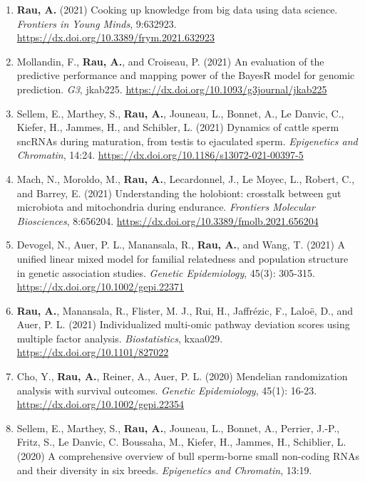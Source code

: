 \documentclass[11pt, a4paper]{awesome-cv}
\providecommand{\tightlist}{%
	\setlength{\itemsep}{0pt}\setlength{\parskip}{0pt}}
\begin{document}
\begin{enumerate}
\def\labelenumi{\arabic{enumi}.}
\tightlist
\item
  \textbf{Rau, A.} (2021) Cooking up knowledge from big data using data
  science. \emph{Frontiers in Young Minds}, 9:632923.
  \url{https://dx.doi.org/10.3389/frym.2021.632923}
\item
  Mollandin, F., \textbf{Rau, A.}, and Croiseau, P. (2021) An evaluation
  of the predictive performance and mapping power of the BayesR model
  for genomic prediction. \emph{G3}, jkab225.
  \url{https://dx.doi.org/10.1093/g3journal/jkab225}
\item
  Sellem, E., Marthey, S., \textbf{Rau, A.}, Jouneau, L., Bonnet, A., Le
  Danvic, C., Kiefer, H., Jammes, H., and Schibler, L. (2021) Dynamics
  of cattle sperm sncRNAs during maturation, from testis to ejaculated
  sperm. \emph{Epigenetics and Chromatin}, 14:24.
  \url{https://dx.doi.org/10.1186/s13072-021-00397-5}
\item
  Mach, N., Moroldo, M., \textbf{Rau, A.}, Lecardonnel, J., Le Moyec,
  L., Robert, C., and Barrey, E. (2021) Understanding the holobiont:
  crosstalk between gut microbiota and mitochondria during endurance.
  \emph{Frontiers Molecular Biosciences}, 8:656204.
  \url{https://dx.doi.org/10.3389/fmolb.2021.656204}
\item
  Devogel, N., Auer, P. L., Manansala, R., \textbf{Rau, A.}, and Wang,
  T. (2021) A unified linear mixed model for familial relatedness and
  population structure in genetic association studies. \emph{Genetic
  Epidemiology}, 45(3): 305-315.
  \url{https://dx.doi.org/10.1002/gepi.22371}
\item
  \textbf{Rau, A.}, Manansala, R., Flister, M. J., Rui, H., Jaffrézic,
  F., Laloë, D., and Auer, P. L. (2021) Individualized multi-omic
  pathway deviation scores using multiple factor analysis.
  \emph{Biostatistics}, kxaa029. \url{https://dx.doi.org/10.1101/827022}
\item
  Cho, Y., \textbf{Rau, A.}, Reiner, A., Auer, P. L. (2020) Mendelian
  randomization analysis with survival outcomes. \emph{Genetic
  Epidemiology}, 45(1): 16-23.
  \url{https://dx.doi.org/10.1002/gepi.22354}
\item
  Sellem, E., Marthey, S., \textbf{Rau, A.}, Jouneau, L., Bonnet, A.,
  Perrier, J.-P., Fritz, S., Le Danvic, C. Boussaha, M., Kiefer, H.,
  Jammes, H., Schiblier, L. (2020) A comprehensive overview of bull
  sperm-borne small non-coding RNAs and their diversity in six breeds.
  \emph{Epigenetics and Chromatin}, 13:19.

\end{enumerate}
\end{document}
